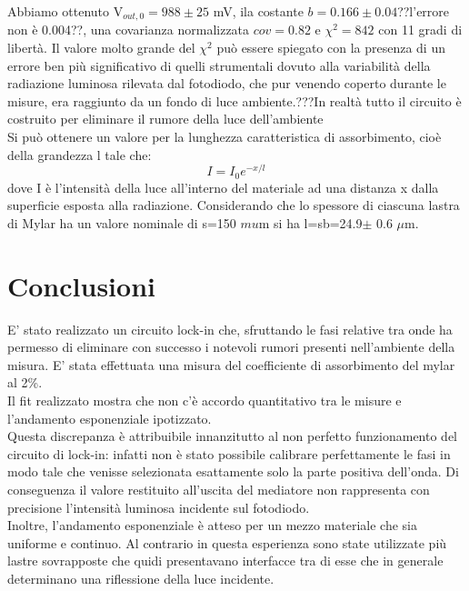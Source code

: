Abbiamo ottenuto V$_{out,0} = 988 \pm 25$ mV, ila costante $b = 0.166 \pm 0.04$??l'errore non è 0.004??, una covarianza normalizzata $cov = 0.82$ e $\chi^2 = 842$ con 11 gradi di libertà. Il valore molto grande del $\chi^2$ può essere spiegato con la presenza di un errore ben più significativo di quelli strumentali dovuto alla variabilità della radiazione luminosa rilevata dal fotodiodo, che pur venendo coperto durante le misure, era raggiunto da un fondo di luce ambiente.???In realtà tutto il circuito è costruito per eliminare il rumore della luce dell'ambiente\\
Si può ottenere un valore per la lunghezza caratteristica di assorbimento, cioè della grandezza l tale che:
\begin{equation}
I=I_{0}e^{-x/l}
\end{equation}
dove I è l'intensità della luce all'interno del materiale ad una distanza x dalla superficie esposta alla radiazione.
Considerando che lo spessore di ciascuna lastra di Mylar ha un valore nominale di s=150 $mu$m si ha l=sb=24.9$ \pm$ 0.6 $\mu$m.



\section{Conclusioni}
E' stato realizzato un circuito lock-in che, sfruttando le fasi relative tra onde ha permesso di eliminare con successo i notevoli rumori presenti nell'ambiente della misura. E' stata effettuata una misura del coefficiente di assorbimento del mylar al 2\%. \\
Il fit realizzato mostra che non c'è accordo quantitativo tra le misure e l'andamento esponenziale ipotizzato.\\
Questa discrepanza è attribuibile innanzitutto al non perfetto funzionamento del circuito di lock-in: infatti non è stato possibile calibrare perfettamente le fasi in modo tale che venisse selezionata esattamente solo la parte positiva dell'onda. Di conseguenza il valore restituito all'uscita del mediatore non rappresenta con precisione l'intensità luminosa incidente sul fotodiodo.\\
Inoltre, l'andamento esponenziale è atteso per un mezzo materiale che sia uniforme e continuo. Al contrario in questa esperienza sono state utilizzate più lastre sovrapposte che quidi presentavano interfacce tra di esse che in generale determinano una riflessione della luce incidente.
